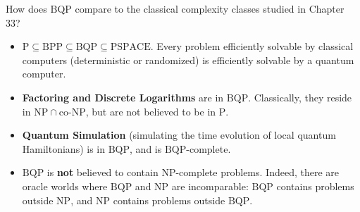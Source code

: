 How does $\mathrm{BQP}$ compare to the classical complexity classes studied in Chapter 33?
\begin{itemize}
  \item $\mathrm{P} \subseteq \mathrm{BPP} \subseteq \mathrm{BQP} \subseteq \mathrm{PSPACE}$.
  Every problem efficiently solvable by classical computers (deterministic or randomized)
  is efficiently solvable by a quantum computer.
  \item \textbf{Factoring and Discrete Logarithms} are in $\mathrm{BQP}$. Classically,
  they reside in $\mathrm{NP} \cap \text{co-NP}$, but are not believed to be in $\mathrm{P}$.
  \item \textbf{Quantum Simulation} (simulating the time evolution of local quantum
  Hamiltonians) is in $\mathrm{BQP}$, and is $\mathrm{BQP}$-complete.
  \item $\mathrm{BQP}$ is \textbf{not} believed to contain $\mathrm{NP}$-complete problems.
  Indeed, there are oracle worlds where $\mathrm{BQP}$ and $\mathrm{NP}$ are incomparable:
  $\mathrm{BQP}$ contains problems outside $\mathrm{NP}$, and $\mathrm{NP}$ contains
  problems outside $\mathrm{BQP}$.
\end{itemize}

